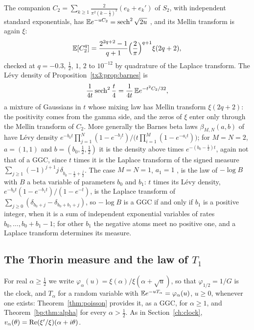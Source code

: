 \begin{remark}\label{tx3:rem:ostrovsky}
The companion $C_2=\sum_{k\ge1}\frac2{\pi^2(k-\frac12)^2}(e_k+e_k')$ of $S_2$, with independent standard exponentials, has $\mathbb{E} e^{-uC_2}=\operatorname{sech}^2\sqrt{2u}$ \cite{BPY01}, and its Mellin transform is again $\xi$:
\[
\mathbb{E}[C_2^q]=\frac{2^{2q+2}-1}{q+1}\Big(\frac2\pi\Big)^{q+1}\xi(2q+2),
\]
checked at $q=-0.3$, $\frac12$, $1$, $2$ to $10^{-12}$ by quadrature of the Laplace transform. The L\'evy density of Proposition~\ref{tx3:prop:barnes} is
\[
\frac1{4t}\operatorname{sech}^2\frac t4=\frac1{4t}\,\mathbb{E} e^{-t^2C_2/32},
\]
a mixture of Gaussians in $t$ whose mixing law has Mellin transform $\xi(2q+2)$: the positivity comes from the gamma side, and the zeros of $\xi$ enter only through the Mellin transform of $C_2$. More generally the Barnes beta laws $\beta_{M,N}(a,b)$ of \cite{Ostrovsky13} have L\'evy density $e^{-b_0t}\prod_{j=1}^N(1-e^{-b_jt})/\big(t\prod_{i=1}^M(1-e^{-a_it})\big)$; for $M=N=2$, $a=(1,1)$ and $b=(b_0,\frac12,\frac12)$ it is the density above times $e^{-(b_0-\frac12)t}$, again not that of a GGC, since $t$ times it is the Laplace transform of the signed measure $\sum_{j\ge1}(-1)^{j+1}j\,\delta_{b_0-\frac12+\frac j2}$. The case $M=N=1$, $a_1=1$ \cite{PolsonRXi26}, is the law of $-\log B$ with $B$ a beta variable of parameters $b_0$ and $b_1$: $t$ times its L\'evy density, $e^{-b_0t}(1-e^{-b_1t})/(1-e^{-t})$, is the Laplace transform of $\sum_{j\ge0}(\delta_{b_0+j}-\delta_{b_0+b_1+j})$, so $-\log B$ is a GGC if and only if $b_1$ is a positive integer, when it is a sum of independent exponential variables of rates $b_0,\dots,b_0+b_1-1$; for other $b_1$ the negative atoms meet no positive one, and a Laplace transform determines its measure.
\end{remark}

\subsection{The Thorin measure and the law of \texorpdfstring{$T_1$}{T1}}\label{bp:sec:thorin}

For real $\alpha\ge\frac12$ we write $\varphi_\alpha(u)=\xi(\alpha)/\xi(\alpha+\sqrt u)$, so that $\varphi_{1/2}=1/G$ is the clock, and $T_\alpha$ for a random variable with $\mathbb{E} e^{-uT_\alpha}=\varphi_\alpha(u)$, $u\ge0$, whenever one exists: Theorem~\ref{thm:poisson} provides it, as a GGC, for $\alpha\ge1$, and Theorem~\ref{bp:thm:alpha} for every $\alpha>\frac12$. As in Section~\ref{ch:clock}, $v_\alpha(\theta)=\operatorname{Re}(\xi'/\xi)(\alpha+i\theta)$.

